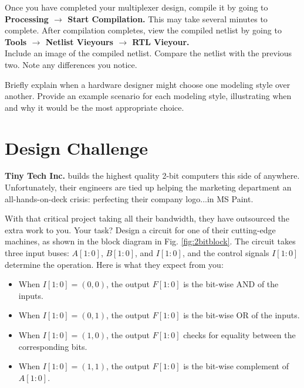 \documentclass[12pt]{journal}
\begin{document}
\clearpage

\begin{question}
    Once you have completed your multiplexer design, compile it by going to \textbf{Processing $\longrightarrow$ Start Compilation.} This may take several minutes to complete. After compilation completes, view the compiled netlist by going to \textbf{Tools $\longrightarrow$ Netlist Vieyours $\longrightarrow$ RTL Vieyour.} \\
    Include an image of the compiled netlist. Compare the netlist with the previous two. Note any differences you notice.
\end{question}

\begin{question}
    Briefly explain when a hardware designer might choose one modeling style over another. Provide an example scenario for each modeling style, illustrating when and why it would be the most appropriate choice.
\end{question}

\clearpage
\section{Design Challenge}


\textbf{Tiny Tech Inc.} builds the highest quality 2-bit computers this side of anywhere. Unfortunately, their engineers are tied up helping the marketing department an all-hands-on-deck crisis: perfecting their company logo...in MS Paint.

With that critical project taking all their bandwidth, they have outsourced the extra work to you. Your task? Design a circuit for one of their cutting-edge machines, as shown in the block diagram in Fig. \ref{fig:2bitblock}. The circuit takes three input buses: \(A[1:0]\), \(B[1:0]\), and \(I[1:0]\), and the control signals \(I[1:0]\) determine the operation. Here is what they expect from you:

\begin{itemize}
  \item When \(I[1:0] = (0,0)\), the output \(F[1:0]\) is the bit-wise AND of the inputs.
  \item When \(I[1:0] = (0,1)\), the output \(F[1:0]\) is the bit-wise OR of the inputs.
  \item When \(I[1:0] = (1,0)\), the output \(F[1:0]\) checks for equality between the corresponding bits.
  \item When \(I[1:0] = (1,1)\), the output \(F[1:0]\) is the bit-wise complement of \(A[1:0]\).
\end{itemize}
\end{document}
